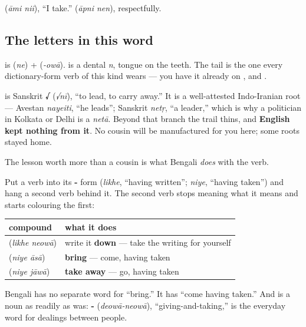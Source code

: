   (\emph{āmi nii}), \textquotedblleft{}I take.\textquotedblright{}   (\emph{āpni nen}), respectfully.

\subsection*{The letters in this word}
\textbf{} is \textbf{} (\emph{ne}) + \textbf{} (\emph{-owā}). \textbf{} is a dental \emph{n}, tongue on the teeth. The \textbf{} tail is the one every dictionary-form verb of this kind wears — you have it already on ,  and .

\begin{cousinweb}
\textbf{} is Sanskrit \textbf{√} (\emph{√nī}), \textquotedblleft{}to lead, to carry away.\textquotedblright{} It is a well-attested Indo-Iranian root — Avestan \emph{nayeiti}, \textquotedblleft{}he leads\textquotedblright{}; Sanskrit \emph{netṛ}, \textquotedblleft{}a leader,\textquotedblright{} which is why a politician in Kolkata or Delhi is a \emph{netā}. Beyond that branch the trail thins, and \textbf{English kept nothing from it}. No cousin will be manufactured for you here; some roots stayed home.

The lesson worth more than a cousin is what Bengali \emph{does} with the verb.
\end{cousinweb}

\begin{grammarlens}[title={Grammar Lens: the verb that ends a compound}]
Put a verb into its \textbf{-} form (\emph{likhe}, \textquotedblleft{}having written\textquotedblright{}; \emph{niye}, \textquotedblleft{}having taken\textquotedblright{}) and hang a second verb behind it. The second verb stops meaning what it means and starts colouring the first:

\noindent
\begin{tabularx}{\linewidth}{@{}>{\raggedright\arraybackslash}X>{\raggedright\arraybackslash}X@{}}
\toprule
\textbf{compound} & \textbf{what it does} \\
\midrule
\bn{লিখে} \bn{নেওয়া} (\emph{likhe neowā}) & write it \textbf{down} — take the writing for yourself \\
\bn{নিয়ে} \bn{আসা} (\emph{niye āsā}) & \textbf{bring} — come, having taken \\
\bn{নিয়ে} \bn{যাওয়া} (\emph{niye jāwā}) & \textbf{take away} — go, having taken \\
\bottomrule
\end{tabularx}

Bengali has no separate word for \textquotedblleft{}bring.\textquotedblright{} It has \textquotedblleft{}come having taken.\textquotedblright{} And  is a noun as readily as  was: \textbf{-} (\emph{deowā-neowā}), \textquotedblleft{}giving-and-taking,\textquotedblright{} is the everyday word for dealings between people.
\end{grammarlens}

